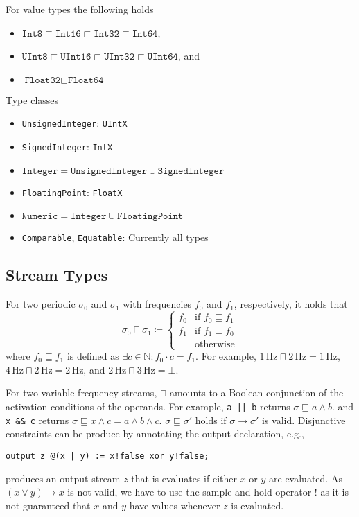 \documentclass{article}
\newcommand{\nats}{\mathbb{N}}
\newcommand{\type}[1]{\texttt{#1}}
\begin{document}
For value types the following holds
\begin{itemize}
  \item $\type{Int8} \sqsubset \type{Int16} \sqsubset \type{Int32} \sqsubset \type{Int64}$,
  \item $\type{UInt8} \sqsubset \type{UInt16} \sqsubset \type{UInt32} \sqsubset \type{UInt64}$, and
  \item $\type{Float32} \sqsubset \type{Float64}$
\end{itemize}

Type classes
\begin{itemize}
  \item \type{UnsignedInteger}: \type{UIntX}
  \item \type{SignedInteger}: \type{IntX}
  \item $\type{Integer} = \type{UnsignedInteger} \cup \type{SignedInteger}$
  \item \type{FloatingPoint}: \type{FloatX}
  \item $\type{Numeric} = \type{Integer} \cup \type{FloatingPoint}$
  \item \type{Comparable}, \type{Equatable}: Currently all types
\end{itemize}

\subsection{Stream Types}

For two periodic $\sigma_0$ and $\sigma_1$ with frequencies $f_0$ and $f_1$, respectively, it holds that
\begin{equation*}
  \sigma_0 \sqcap \sigma_1 \coloneqq
  \begin{cases}
    f_0 & \text{if } f_0 \sqsubseteq f_1 \\
    f_1 & \text{if } f_1 \sqsubseteq f_0 \\
    \bot & \text{otherwise}
  \end{cases}
\end{equation*}
where $f_0 \sqsubseteq f_1$ is defined as $\exists c \in \nats \colon f_0 \cdot c = f_1$.
%
For example, $1\,\text{Hz} \sqcap 2\,\text{Hz} = 1\,\text{Hz}$, $4\,\text{Hz} \sqcap 2\,\text{Hz} = 2\,\text{Hz}$, and $2\,\text{Hz} \sqcap 3\,\text{Hz} = \bot$.

For two variable frequency streams, $\sqcap$ amounts to a Boolean conjunction of the activation conditions of the operands.
%
For example, \texttt{a || b} returns $\sigma \sqsubseteq a \land b$. and \texttt{x \&\& c} returns $\sigma \sqsubseteq x \land c = a \land b \land c$.
$\sigma \sqsubseteq \sigma'$ holds if $\sigma \rightarrow \sigma'$ is valid.
Disjunctive constraints can be produce by annotating the output declaration, e.g.,
\begin{lstlisting}
output z @(x | y) := x!false xor y!false;
\end{lstlisting}
produces an output stream $z$ that is evaluates if either $x$ or $y$ are evaluated.
As $(x \lor y) \rightarrow x$ is not valid, we have to use the sample and hold operator $!$ as it is not guaranteed that $x$ and $y$ have values whenever $z$ is evaluated.
\end{document}
